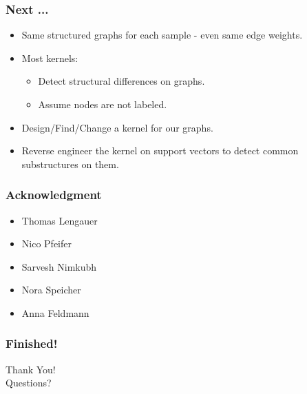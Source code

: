 \documentclass{beamer}
\begin{document}
\begin{frame}
  \frametitle{Next ...}
  \begin{itemize}
  \item Same structured graphs for each sample - even same edge weights.
  \item Most kernels:
    \begin{itemize}
    \item Detect structural differences on graphs.
    \item Assume nodes are not labeled.
    \end{itemize}
  \item Design/Find/Change a kernel for our graphs.
  \item Reverse engineer the kernel on support vectors to detect common substructures on them.
  \end{itemize}
\end{frame}

\begin{frame}[plain]
\frametitle{Acknowledgment}
\begin{itemize}
\item Thomas Lengauer
\item Nico Pfeifer
\item Sarvesh Nimkubh
\item Nora Speicher
\item Anna Feldmann
\end{itemize}
\end{frame}

\begin{frame}[plain]
\frametitle{Finished!}
  \begin{center}
    \Huge{Thank You!}\\
    Questions?
  \end{center}
\end{frame}
\end{document}
